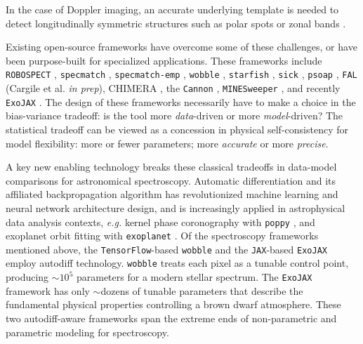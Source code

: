 \documentclass[modern]{aastex631}
\begin{document}
In the case of Doppler imaging, an accurate underlying template is needed to detect longitudinally symmetric structures \citep{1983PASP...95..565V,2021arXiv211006271L} such as polar spots \citep{roettenbacher16} or zonal bands \citep{Crossfield14,2021ApJ...906...64A}.

Existing open-source frameworks have overcome some of these challenges, or have been purpose-built for specialized applications.
These frameworks include \texttt{ROBOSPECT} \citep{2013PASP..125.1164W}, \texttt{specmatch} \citep{2015PhDT........82P}, \texttt{specmatch-emp} \citep{2017ApJ...836...77Y}, \texttt{wobble} \citep{2019AJ....158..164B}, \texttt{starfish} \citep{czekala15}, \texttt{sick} \citep{2016ApJS..223....8C}, \texttt{psoap} \citep{2017ApJ...840...49C}, \texttt{FAL} (Cargile et al. \emph{in prep}), CHIMERA \citep{2015ApJ...807..183L}, the \texttt{Cannon} \citep{2017ApJ...836....5H},  \texttt{MINESweeper} \citep{2020ApJ...900...28C}, and recently \texttt{ExoJAX} \citep{2022ApJS..258...31K}.
The design of these frameworks necessarily have to make a choice in the bias-variance tradeoff: is the tool more \emph{data}-driven or more \emph{model}-driven?  The statistical tradeoff can be viewed as a concession in physical self-consistency for model flexibility: more or fewer parameters; more \emph{accurate} or more \emph{precise}.

A key new enabling technology breaks these classical tradeoffs in data-model comparisons for astronomical spectroscopy.  Automatic differentiation \citep[``autodiff'',][]{2015arXiv150205767G} and its affiliated backpropagation algorithm has revolutionized machine learning and neural network architecture design, and is increasingly applied in astrophysical data analysis contexts, \emph{e.g.} kernel phase coronography with \texttt{poppy} \citep{2021ApJ...907...40P}, and exoplanet orbit fitting with \texttt{exoplanet} \citep{2021JOSS....6.3285F}.  Of the spectroscopy frameworks mentioned above, the \texttt{TensorFlow}-based \citep{tensorflow2015-whitepaper} \texttt{wobble} and the \texttt{JAX}-based \citep{jax2018github} \texttt{ExoJAX} employ autodiff technology.  \texttt{wobble} treats each pixel as a tunable control point, producing $\sim10^5$ parameters for a modern stellar spectrum.  The \texttt{ExoJAX} framework has only $\sim$dozens of tunable parameters that describe the fundamental physical properties controlling a brown dwarf atmosphere.  These two autodiff-aware frameworks span the extreme ends of non-parametric and parametric modeling for spectroscopy.
\end{document}
